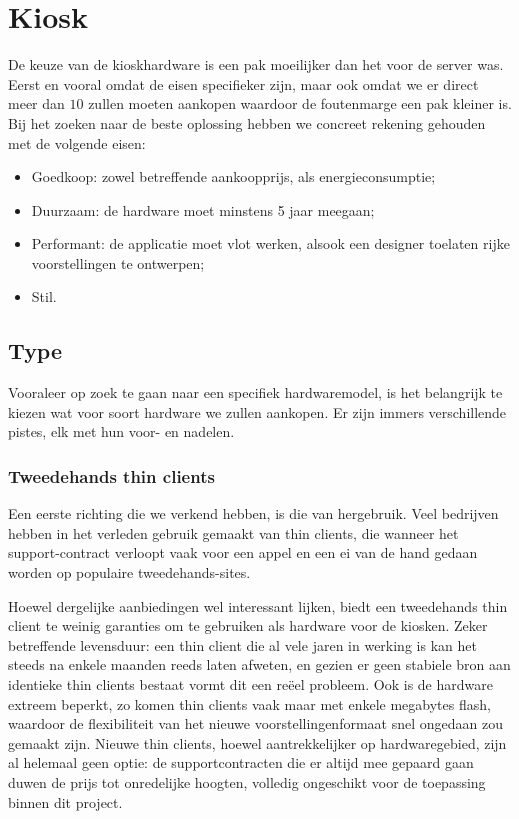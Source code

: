 \section{Kiosk}
\label{ontwerp:hardware:kiosk}

De keuze van de kioskhardware is een pak moeilijker dan het voor de server was. Eerst en vooral omdat de eisen specifieker zijn, maar ook omdat we er direct meer dan $10$ zullen moeten aankopen waardoor de foutenmarge een pak kleiner is. Bij het zoeken naar de beste oplossing hebben we concreet rekening gehouden met de volgende eisen:
\begin{itemize}
\item Goedkoop: zowel betreffende aankoopprijs, als energieconsumptie;
\item Duurzaam: de hardware moet minstens 5 jaar meegaan;
\item Performant: de applicatie moet vlot werken, alsook een designer toelaten rijke voorstellingen te ontwerpen;
\item Stil.
\end{itemize}

\subsection{Type}

Vooraleer op zoek te gaan naar een specifiek hardwaremodel, is het belangrijk te kiezen wat voor soort hardware we zullen aankopen. Er zijn immers verschillende pistes, elk met hun voor- en nadelen.

\subsubsection{Tweedehands thin clients}

Een eerste richting die we verkend hebben, is die van hergebruik. Veel bedrijven hebben in het verleden gebruik gemaakt van thin clients, die wanneer het support-contract verloopt vaak voor een appel en een ei van de hand gedaan worden op populaire tweedehands-sites.

Hoewel dergelijke aanbiedingen wel interessant lijken, biedt een tweedehands thin client te weinig garanties om te gebruiken als hardware voor de kiosken. Zeker betreffende levensduur: een thin client die al vele jaren in werking is kan het steeds na enkele maanden reeds laten afweten, en gezien er geen stabiele bron aan identieke thin clients bestaat vormt dit een reëel probleem. Ook is de hardware extreem beperkt, zo komen thin clients vaak maar met enkele megabytes flash, waardoor de flexibiliteit van het nieuwe voorstellingenformaat snel ongedaan zou gemaakt zijn. Nieuwe thin clients, hoewel aantrekkelijker op hardwaregebied, zijn al helemaal geen optie: de supportcontracten die er altijd mee gepaard gaan duwen de prijs tot onredelijke hoogten, volledig ongeschikt voor de toepassing binnen dit project.


